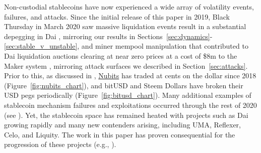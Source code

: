 Non-custodial stablecoins have now experienced a wide array of volatility events, failures, and attacks.
Since the initial release of this paper in 2019, Black Thursday in March 2020 saw massive liquidation events result in a substantial depegging in Dai \cite{maker_spiral2020}, mirroring our results in Sections~\ref{sec:dynamics}-\ref{sec:stable_v_unstable}, and miner mempool manipulation that contributed to Dai liquidation auctions clearing at near zero prices at a cost of \$8m to the Maker system \cite{blocknative2020}, mirroring attack surfaces we described in Section~\ref{sec:attacks}.
Prior to this, as discussed in \cite{klagesmundt2018state}, \href{https://nubits.com/}{Nubits} has traded at cents on the dollar since 2018 (Figure~\ref{fig:nubits_chart}), and bitUSD and Steem Dollars have broken their USD pegs periodically (Figure~\ref{fig:bitusd_chart}).
Many additional examples of stablecoin mechanism failures and exploitations occurred through the rest of 2020 (see \cite{klagesmundt2020stablecoins,werner2021sok}).
Yet, the stablecoin space has remained heated with projects such as Dai growing rapidly and many new contenders arising, including UMA, Reflexer, Celo, and Liquity. The work in this paper has proven consequential for the progression of these projects (e.g., \cite{theblock_Maker2019,awesomeMakerDAO}).




